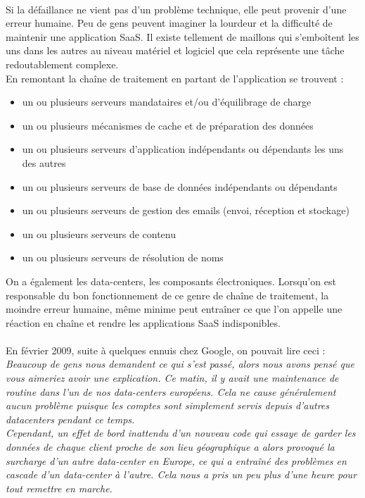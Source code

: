 \documentclass[a4paper,12pt]{report}
\begin{document}
\begin{onehalfspace}
	 \paragraph*{}
	 Si la défaillance ne vient pas d'un problème technique, elle peut provenir d'une erreur humaine. Peu de gens peuvent imaginer la lourdeur et la difficulté de maintenir une application SaaS. Il existe
tellement de maillons qui s'emboîtent les uns dans les autres au niveau matériel et logiciel que cela représente une tâche redoutablement complexe.\\
En remontant la chaîne de traitement en partant de l'application se trouvent :
	\begin{itemize}
		\item un ou plusieurs serveurs mandataires et/ou d'équilibrage de charge
		\item un ou plusieurs mécanismes de cache et de préparation des données
		\item un ou plusieurs serveurs d'application indépendants ou dépendants les uns des autres
		\item un ou plusieurs serveurs de base de données indépendants ou dépendants
		\item un ou plusieurs serveurs de gestion des emails (envoi, réception et stockage)
		\item un ou plusieurs serveurs de contenu
		\item un ou plusieurs serveurs de résolution de noms
	\end{itemize}
	On a également les data-centers, les composants électroniques. Lorsqu'on est responsable du bon fonctionnement de ce genre de chaîne de traitement, la moindre erreur humaine, même minime peut entraîner ce que l'on appelle une réaction en chaîne et rendre les applications SaaS indisponibles.
	
	\paragraph*{}
	En février 2009, suite à quelques ennuis chez Google, on pouvait lire ceci : \\
	\textit{Beaucoup de gens nous demandent ce qui s'est passé, alors nous avons pensé que vous aimeriez avoir une explication. Ce matin, il y avait une maintenance de routine dans l'un de nos data-centers européens. Cela ne cause généralement aucun problème puisque les comptes sont simplement servis depuis d'autres datacenters pendant ce temps. \\ Cependant, un effet de bord inattendu d'un nouveau code qui essaye de garder les données de chaque client proche de son lieu géographique a alors provoqué la surcharge d'un autre data-center en Europe, ce qui a entraîné des problèmes en cascade d'un data-center à l'autre. Cela nous a pris un peu plus d'une heure pour tout remettre en marche.}


\end{onehalfspace}
\end{document}
